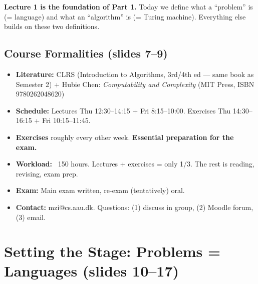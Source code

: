 \documentclass[11pt,a4paper]{article}
\begin{document}
\textbf{Lecture 1 is the foundation of Part 1.} Today we define what a ``problem'' is (= language) and what an ``algorithm'' is (= Turing machine). Everything else builds on these two definitions.


\subsection{Course Formalities (slides 7--9)}

\begin{itemize}[nosep]
\item \textbf{Literature:} CLRS (Introduction to Algorithms, 3rd/4th ed --- same book as Semester 2) + Hubie Chen: \textit{Computability and Complexity} (MIT Press, ISBN 9780262048620)
\item \textbf{Schedule:} Lectures Thu 12:30--14:15 + Fri 8:15--10:00. Exercises Thu 14:30--16:15 + Fri 10:15--11:45.
\item \textbf{Exercises} roughly every other week. \textbf{Essential preparation for the exam.}
\item \textbf{Workload:} ~150 hours. Lectures + exercises = only 1/3. The rest is reading, revising, exam prep.
\item \textbf{Exam:} Main exam written, re-exam (tentatively) oral.
\item \textbf{Contact:} mzi@cs.aau.dk. Questions: (1) discuss in group, (2) Moodle forum, (3) email.
\end{itemize}


\newpage
\section{Setting the Stage: Problems = Languages (slides 10--17)}
\end{document}
